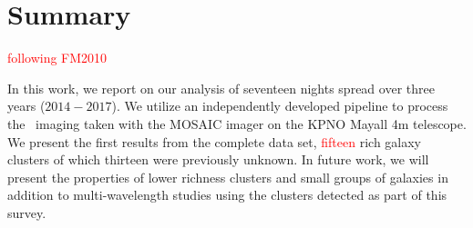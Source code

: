 \documentclass[apj, revtex4-1]{emulateapj}
\newcommand{\editorial}[1]{\textcolor{red}{#1}}
\begin{document}
\section{Summary}\label{sec:summary}

\editorial{following FM2010}

In this work, we report on our analysis of seventeen nights spread over three years ($2014-2017$). We utilize an independently developed pipeline to process the \sdssg\sdssr\sdssi\sdssz\ imaging taken with the MOSAIC imager on the KPNO Mayall 4m telescope. We present the first results from the complete data set, \editorial{fifteen} rich galaxy clusters of which thirteen were previously unknown. In future work, we will present the properties of lower richness clusters and small groups of galaxies in addition to multi-wavelength studies using the clusters detected as part of this survey.
\end{document}
